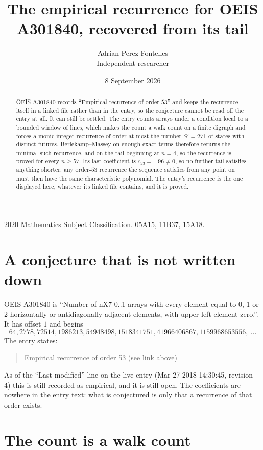 \documentclass[11pt,a4paper]{article}
\title{The empirical recurrence for OEIS A301840, recovered from its tail}
\author{Adrian Perez Fontelles\\ \small Independent researcher}
\date{8 September 2026}
\theoremstyle{plain}
\theoremstyle{definition}
\begin{document}
\maketitle

\begin{abstract}
OEIS A301840 records ``Empirical recurrence of order $53$'' and keeps the recurrence itself in
a linked file rather than in the entry, so the conjecture cannot be read off the entry at all.
It can still be settled. The entry counts arrays under a condition local to a bounded window of
lines, which makes the count a walk count on a finite digraph and forces a monic integer
recurrence of order at most the number $S'=271$ of states with distinct futures. Berlekamp--Massey on
enough exact terms therefore returns the minimal such recurrence, and on the tail beginning at $n=4$, so the recurrence is proved for every $n\ge57$.
Its last coefficient is $c_{53}=-96\neq0$, so no further tail satisfies anything
shorter; any order-$53$ recurrence the sequence satisfies from any point on must then have
the same characteristic polynomial. The entry's recurrence is the one displayed here, whatever
its linked file contains, and it is proved.
\end{abstract}

\noindent\small 2020 Mathematics Subject Classification. 05A15, 11B37, 15A18.\normalsize

\section{A conjecture that is not written down}

OEIS A301840 is ``Number of nX7 0..1 arrays with every element equal to 0, 1 or 2 horizontally or antidiagonally adjacent elements, with upper left element zero.''. It has offset $1$ and begins
\[
64, 2778, 72514, 1986213, 54948498, 1518341751, 41966406867, 1159968653556,\ \dots
\]
The entry states:
\begin{quote}
Empirical recurrence of order 53 (see link above)
\end{quote}
As of the ``Last modified'' line on the live entry (Mar 27 2018 14:30:45, revision 4)
this is still recorded as empirical, and it is still open. The coefficients are nowhere in the
entry text: what is conjectured is only that a recurrence of that order exists.

\section{The count is a walk count}
\end{document}
